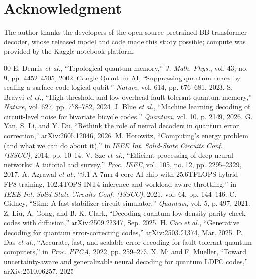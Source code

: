 ﻿\documentclass[conference]{IEEEtran}
\begin{document}
\section*{Acknowledgment}
The author thanks the developers of the open-source pretrained BB
transformer decoder, whose released model and code made this study
possible; compute was provided by the Kaggle notebook platform.
\begin{thebibliography}{00}\footnotesize\setlength{\itemsep}{0pt}\setlength{\parsep}{0pt}\setlength{\parskip}{0pt}
 E. Dennis \emph{et al.},
``Topological quantum memory,'' \emph{J. Math. Phys.}, vol. 43, no. 9,
pp. 4452--4505, 2002.
 Google Quantum AI, ``Suppressing quantum errors by
scaling a surface code logical qubit,'' \emph{Nature}, vol. 614,
pp. 676--681, 2023.
 S. Bravyi \emph{et al.}, ``High-threshold and
low-overhead fault-tolerant quantum memory,'' \emph{Nature}, vol. 627,
pp. 778--782, 2024.
 J. Blue \emph{et al.},
``Machine learning decoding of circuit-level noise for bivariate bicycle
codes,'' \emph{Quantum}, vol. 10, p. 2149, 2026.
 G. Yan, S. Li, and Y. Du, ``Rethink the role of
neural decoders in quantum error correction,'' arXiv:2605.12046, 2026.
 M. Horowitz, ``Computing's energy problem (and what we
can do about it),'' in \emph{IEEE Int. Solid-State Circuits Conf. (ISSCC)},
2014, pp. 10--14.
 V. Sze \emph{et al.},
``Efficient processing of deep neural networks: A tutorial and survey,''
\emph{Proc. IEEE}, vol. 105, no. 12, pp. 2295--2329, 2017.
 A. Agrawal \emph{et al.}, ``9.1 A 7nm 4-core AI chip
with 25.6TFLOPS hybrid FP8 training, 102.4TOPS INT4 inference and
workload-aware throttling,'' in \emph{IEEE Int. Solid-State Circuits Conf.
(ISSCC)}, 2021, vol. 64, pp. 144--146.
 C. Gidney, ``Stim: A fast stabilizer circuit simulator,''
\emph{Quantum}, vol. 5, p. 497, 2021.
Z. Liu, A. Gong, and B. K. Clark, ``Decoding quantum low density parity check codes with diffusion,'' arXiv:2509.22347, Sep. 2025.
H. Cao \emph{et al.}, ``Generative decoding for quantum error-correcting codes,'' arXiv:2503.21374, Mar. 2025.
P. Das \emph{et al.}, ``Accurate, fast, and scalable error-decoding for fault-tolerant quantum computers,'' in \emph{Proc. HPCA}, 2022, pp. 259--273.
X. Mi and F. Mueller, ``Toward uncertainty-aware and generalizable neural decoding for quantum LDPC codes,'' arXiv:2510.06257, 2025
\end{thebibliography}
\end{document}
